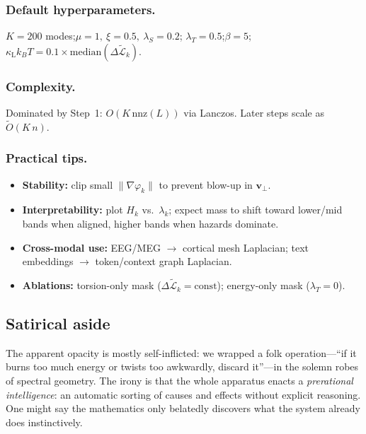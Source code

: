 \documentclass[a4paper,11pt]{article}
\begin{document}
\subsubsection{Default hyperparameters.}
$K=200$ modes;\quad $\mu=1,\ \xi=0.5,\ \lambda_S=0.2$;\quad
$\lambda_T=0.5$;\quad $\beta=5$;\quad
$\kappa_{\mathrm L}k_B T=0.1\!\times\!\mathrm{median}(\Delta\widetilde{\mathcal{L}}_k)$.

\subsubsection{Complexity.}
Dominated by Step~1: $O(K\,\mathrm{nnz}(L))$ via Lanczos.
Later steps scale as $\tilde O(K\,n)$.

\subsubsection{Practical tips.}
\begin{itemize}
\item \textbf{Stability:} clip small $\|\nabla\varphi_k\|$ to prevent blow-up
in $\mathbf v_\perp$.
\item \textbf{Interpretability:} plot $H_k$ vs.\ $\lambda_k$; expect mass to
shift toward lower/mid bands when aligned, higher bands when hazards dominate.
\item \textbf{Cross-modal use:} EEG/MEG $\to$ cortical mesh Laplacian; text
embeddings $\to$ token/context graph Laplacian.
\item \textbf{Ablations:} torsion-only mask
($\Delta\widetilde{\mathcal{L}}_k\!=\!\text{const}$); energy-only mask
($\lambda_T=0$).
\end{itemize}

\subsection{Satirical aside}
The apparent opacity is mostly self-inflicted: we wrapped a folk
operation---``if it burns too much energy or twists too awkwardly, discard
it''---in the solemn robes of spectral geometry. The irony is that the whole
apparatus enacts a \emph{prerational intelligence}: an automatic sorting of
causes and effects without explicit reasoning. One might say the mathematics
only belatedly discovers what the system already does instinctively.
\end{document}
